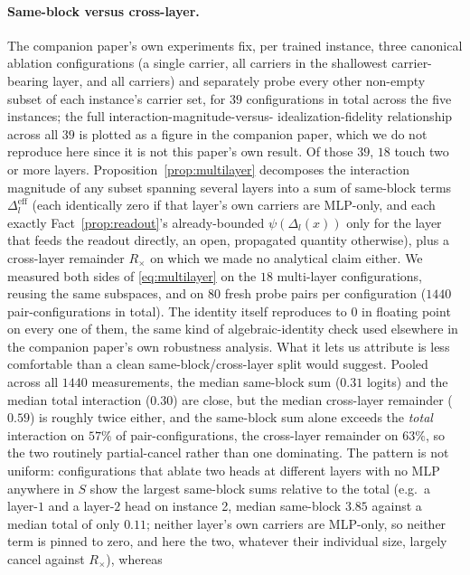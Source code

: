 \documentclass[11pt,a4paper]{article}
\begin{document}
\paragraph{Same-block versus cross-layer.} The companion paper's own
experiments fix, per trained instance, three canonical ablation
configurations (a single carrier, all carriers in the shallowest
carrier-bearing layer, and all carriers) and separately probe every other
non-empty subset of each instance's carrier set, for $39$ configurations in
total across the five instances; the full interaction-magnitude-versus-
idealization-fidelity relationship across all $39$ is plotted as a figure in
the companion paper, which we do not reproduce here since it is not this
paper's own result. Of those $39$, $18$ touch two or more layers.
Proposition~\ref{prop:multilayer} decomposes the interaction magnitude of any
subset spanning several layers into a sum of same-block terms
$\Delta_l^{\mathrm{eff}}$ (each identically zero if that layer's own carriers
are MLP-only, and each exactly Fact~\ref{prop:readout}'s already-bounded
$\psi(\Delta_l(x))$ only for the layer that feeds the readout directly, an
open, propagated quantity otherwise), plus a cross-layer remainder
$R_\times$ on which we made no analytical claim either. We measured both
sides of \eqref{eq:multilayer} on the $18$ multi-layer configurations,
reusing the same subspaces, and on $80$ fresh probe pairs per configuration
($1440$ pair-configurations in total). The identity itself reproduces to $0$
in floating point on every one of them, the same kind of algebraic-identity
check used elsewhere in the companion paper's own robustness analysis. What
it lets us attribute is less comfortable than a clean same-block/cross-layer
split would suggest. Pooled across all $1440$ measurements, the median
same-block sum ($0.31$ logits) and the median total interaction ($0.30$) are
close, but the median cross-layer remainder ($0.59$) is roughly twice
either, and the same-block sum alone exceeds the \emph{total} interaction on
$57\%$ of pair-configurations, the cross-layer remainder on $63\%$, so the
two routinely partial-cancel rather than one dominating. The pattern is not
uniform: configurations that ablate two heads at different layers with no
MLP anywhere in $S$ show the largest same-block sums relative to the total
(e.g.\ a layer-$1$ and a layer-$2$ head on instance 2, median same-block
$3.85$ against a median total of only $0.11$; neither layer's own carriers
are MLP-only, so neither term is pinned to zero, and here the two, whatever
their individual size, largely cancel against $R_\times$), whereas
\end{document}
